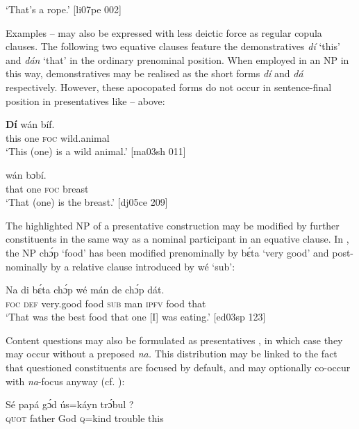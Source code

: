 \glt ‘That’s a rope.’ [li07pe 002]
\z

Examples – may also be expressed with less deictic force as regular copula clauses. The following two equative clauses feature the demonstratives \textit{dí} ‘this’ and \textit{dán} ‘that’ in the ordinary prenominal position. When employed in an NP in this way, demonstratives may be realised as the short forms \textit{dí} and \textit{dá} respectively. However, these apocopated forms do not occur in sentence-final position in presentatives like –  above: 


\ea%
    \label{ex:key:728}
    \gll \textbf{Dí}  wán     bíf.\\
this  one    \textsc{foc}  wild.animal\\

\glt ‘This (one) is a wild animal.’ [ma03sh 011]
\z


\ea%
    \label{ex:key:729}
    \gll {}  wán     bɔbí.\\
that  one    \textsc{foc}  breast\\

\glt ‘That (one) is the breast.’ [dj05ce 209]
\z

The highlighted NP of a presentative construction may be modified by further constituents in the same way as a nominal participant in an equative clause. In , the NP chɔ́p ‘food’ has been modified prenominally by bɛ́ta ‘very good’ and post-nominally by a relative clause{\fff} introduced by wé ‘sub’: 


\ea%
    \label{ex:key:730}
    \gll Na  di  bɛ́ta      chɔ́p  wé  mán    de  chɔ́p  dát.\\
\textsc{foc}  \textsc{def}  very.good  food    \textsc{sub}  man    \textsc{ipfv}  food    that\\

\glt ‘That was the best food that one [I] was eating.’ [ed03sp 123]
\z

Content questions may also be formulated as presentatives , in which case they may occur without a preposed \textit{na.} This distribution may be linked to the fact that questioned constituents are focused by default, and may optionally co-occur with \textit{na}{}-focus anyway (cf. ):


\ea%
    \label{ex:key:731}
    \gll Sé  papá  gɔ́d\textstylePichiexamplebold{} ús=káyn  trɔ́bul  ?\\
\textsc{quot}  father  God  \textsc{q}=kind  trouble  this\\

